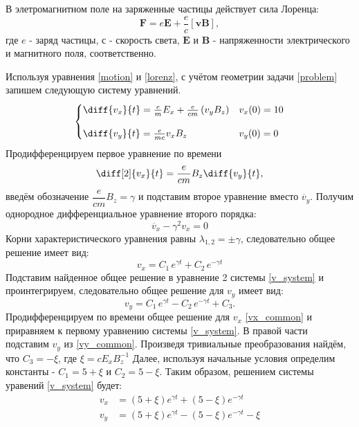 \documentclass[a4paper]{article}
\begin{document}
В элетромагнитном поле на заряженные частицы действует сила Лоренца:
\begin{equation}\label{lorenz}
\mathbf{F} = e \mathbf{E} + \frac{e}{c}\left[\mathbf{vB}\right],
\end{equation}
где $e$ - заряд частицы, $с$ - скорость света, $\mathbf{E}$ и $\mathbf{B}$ - напряженности электрического и магнитного поля, соответственно.

Используя уравнения \eqref{motion} и \eqref{lorenz}, с учётом геометрии задачи \ref{problem} запишем следующую систему уравнений.
\begin{equation}\label{v_system}
\begin{cases}
\diff{v_x}{t} = \frac{e}{m}E_x + \frac{e}{cm}\left(v_yB_z\right)	& 	v_x(0) = 10 \\[10pt]
\diff{v_y}{t} = \frac{e}{mc} v_x B_z					&	v_y(0) = 0 \\
\end{cases}
\end{equation}
Продифференцируем первое уравнение по времени
\[
\diff[2]{v_x}{t} =\frac{e}{cm} B_z \diff{v_y}{t},
\]
введём обозначение $\dfrac{e}{cm}B_z = \gamma$ и подставим второе уравнение вместо $\dot{v_y}$. Получим однородное дифференциальное уравнение второго порядка:
\[
\ddot{v_x} - \gamma^2 v_x = 0		
\]
Корни характеристического уравнения равны $\lambda_{1,2} = \pm \gamma$, следовательно общее решение имеет вид:
\begin{equation}\label{vx_common}
v_x = C_1\, e^{\gamma t} + C_2\, e^{-\gamma t}
\end{equation}
Подставим найденное общее решение в уравнение 2 системы \eqref{v_system} и проинтегрируем, следовательно общее решение для $v_y$ имеет вид:
\begin{equation}\label{vy_common}
v_y = C_1 \, e^{\gamma t} - C_2 \, e^{-\gamma t} + C_3 .
\end{equation}
Продифференцируем по времени общее решение для $v_x$ \eqref{vx_common} и приравняем к первому уравнению системы \eqref{v_system}. В правой части подставим $v_y$ из \eqref{vy_common}. Произведя тривиальные преобразования найдём, что $C_3 = -\xi$, где $\xi = cE_xB_z^{-1}$ Далее, используя начальные условия определим константы - $C_1 = 5 + \xi$ и $C_2 = 5 - \xi$. Таким образом, решением системы уравений \eqref{v_system} будет:
\begin{align}\label{analytic}
v_x &= (5 + \xi)e^{\gamma t} + (5 - \xi)e^{-\gamma t} \\
v_y &= (5 + \xi)e^{\gamma t} - (5 - \xi)e^{-\gamma t} -\xi 
\end{align}
\end{document}
